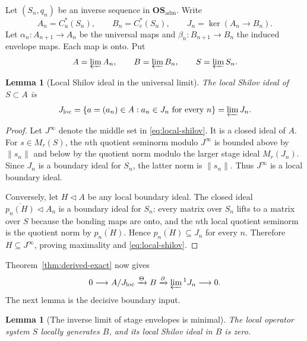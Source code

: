 \documentclass[11pt,a4paper]{amsart}
\theoremstyle{plain}
\newtheorem{lemma}[theorem]{Lemma}
\theoremstyle{definition}
\newcommand{\Cu}{C_u^*}
\newcommand{\Ce}{C_e^*}
\newcommand{\OSadm}{\mathbf{OS}_{\mathrm{adm}}}
\begin{document}
Let $(S_n,q_n)$ be an inverse sequence in $\OSadm$.  Write
\[
 A_n=\Cu(S_n),\qquad B_n=\Ce(S_n),\qquad J_n=\ker(A_n\to B_n).
\]
Let $\alpha_n:A_{n+1}\to A_n$ be the universal maps and
$\beta_n:B_{n+1}\to B_n$ the induced envelope maps.  Each map is onto.  Put
\[
 A=\varprojlim A_n,\qquad B=\varprojlim B_n,\qquad S=\varprojlim S_n.
\]

\begin{lemma}[Local Shilov ideal in the universal limit]\label{lem:local-shilov}
The local Shilov ideal of $S\subset A$ is
\begin{equation}\label{eq:local-shilov}
 J_{\mathrm{loc}}=
 \{a=(a_n)\in A:a_n\in J_n\text{ for every }n\}
 =\varprojlim J_n.
\end{equation}
\end{lemma}

\begin{proof}
Let $J^\infty$ denote the middle set in \eqref{eq:local-shilov}.  It is a closed ideal of $A$.
For $s\in M_r(S)$, the $n$th quotient seminorm modulo $J^\infty$ is bounded above by
$\|s_n\|$ and below by the quotient norm modulo the larger stage ideal $M_r(J_n)$.  Since $J_n$ is
a boundary ideal for $S_n$, the latter norm is $\|s_n\|$.  Thus $J^\infty$ is a local boundary
ideal.

Conversely, let $H\triangleleft A$ be any local boundary ideal.  The closed ideal
$\overline{p_n(H)}\triangleleft A_n$ is a boundary ideal for $S_n$: every matrix over $S_n$ lifts
to a matrix over $S$ because the bonding maps are onto, and the $n$th local quotient seminorm is
the quotient norm by $\overline{p_n(H)}$.  Hence $\overline{p_n(H)}\subseteq J_n$ for every $n$.
Therefore $H\subseteq J^\infty$, proving maximality and \eqref{eq:local-shilov}.
\end{proof}

Theorem~\ref{thm:derived-exact} now gives
\begin{equation}\label{eq:operator-derived}
 0\longrightarrow A/J_{\mathrm{loc}}
 \xrightarrow{\Theta}B
 \xrightarrow{\partial}\varprojlim{}^1J_n\longrightarrow0.
\end{equation}
The next lemma is the decisive boundary input.

\begin{lemma}[The inverse limit of stage envelopes is minimal]\label{lem:limit-minimal}
The local operator system $S$ locally generates $B$, and its local Shilov ideal in $B$ is zero.
\end{lemma}
\end{document}
